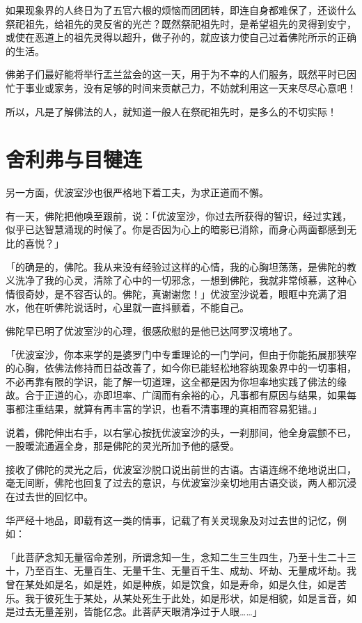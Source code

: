 \documentclass[twoside,openany]{book}
\begin{document}
如果现象界的人终日为了五官六根的烦恼而团团转，即连自身都难保了，还谈什么祭祀祖先，给祖先的灵反省的光芒？既然祭祀祖先时，是希望祖先的灵得到安宁，或使在恶道上的祖先灵得以超升，做子孙的，就应该力使自己过着佛陀所示的正确的生活。

佛弟子们最好能将举行盂兰盆会的这一天，用于为不幸的人们服务，既然平时已因忙于事业或家务，没有足够的时间来贡献己力，不妨就利用这一天来尽尽心意吧！

所以，凡是了解佛法的人，就知道一般人在祭祀祖先时，是多么的不切实际！

\section{舍利弗与目犍连}\label{sec3.17}

另一方面，优波室沙也很严格地下着工夫，为求正道而不懈。

有一天，佛陀把他唤至跟前，说：「优波室沙，你过去所获得的智识，经过实践，似乎已达智慧涌现的时候了。你是否因为心上的暗影已消除，而身心两面都感到无比的喜悦？」

「的确是的，佛陀。我从来没有经验过这样的心情，我的心胸坦荡荡，是佛陀的教义洗净了我的心灵，清除了心中的一切邪念，一想到佛陀，我就非常倾慕，这种心情很奇妙，是不容否认的。佛陀，真谢谢您！」优波室沙说着，眼眶中充满了泪水，他在听佛陀说话时，心里就一直抖颤着，不能自己。

佛陀早已明了优波室沙的心理，很感欣慰的是他已达阿罗汉境地了。

「优波室沙，你本来学的是婆罗门中专重理论的一门学问，但由于你能拓展那狭窄的心胸，依佛法修持而日益改善了，如今你已能轻松地容纳现象界中的一切事相，不必再靠有限的学识，能了解一切道理，这全都是因为你坦率地实践了佛法的缘故。合于正道的心，亦即坦率、广阔而有余裕的心，凡事都有原因与结果，如果每事都注重结果，就算有再丰富的学识，也看不清事理的真相而容易犯错。」

说着，佛陀伸出右手，以右掌心按抚优波室沙的头，一刹那间，他全身震颤不已，一股暖流通遍全身，那是佛陀的灵光所加予他的感受。

接收了佛陀的灵光之后，优波室沙脱口说出前世的古语。古语连绵不绝地说出口，毫无间断，佛陀也回复了过去的意识，与优波室沙亲切地用古语交谈，两人都沉浸在过去世的回忆中。

华严经十地品，即载有这一类的情事，记载了有关灵现象及对过去世的记忆，例如：

「此菩萨念知无量宿命差别，所谓念知一生，念知二生三生四生，乃至十生二十三十，乃至百生、无量百生、无量千生、无量百千生、成劫、坏劫、无量成坏劫。我曾在某处如是名，如是姓，如是种族，如是饮食，如是寿命，如是久住，如是苦乐。我于彼死生于某处，从某处死生于此处，如是形状，如是相貌，如是言音，如是过去无量差别，皆能亿念。此菩萨天眼清净过于人眼……」
\end{document}
